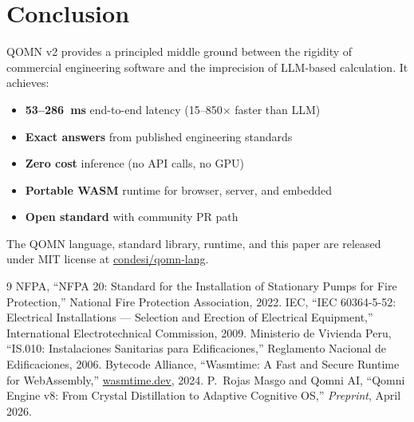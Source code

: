 \documentclass[12pt,a4paper]{article}
\begin{document}
\section{Conclusion}

QOMN v2 provides a principled middle ground between the rigidity of
commercial engineering software and the imprecision of LLM-based calculation.
It achieves:
\begin{itemize}
  \item \textbf{53--286~ms} end-to-end latency (15--850$\times$ faster than LLM)
  \item \textbf{Exact answers} from published engineering standards
  \item \textbf{Zero cost} inference (no API calls, no GPU)
  \item \textbf{Portable WASM} runtime for browser, server, and embedded
  \item \textbf{Open standard} with community PR path
\end{itemize}

The QOMN language, standard library, runtime, and this paper are released
under MIT license at \href{https://github.com/condesi/qomn-lang}{condesi/qomn-lang}.


\begin{thebibliography}{9}
  NFPA, ``NFPA 20: Standard for the Installation of Stationary Pumps
  for Fire Protection,'' National Fire Protection Association, 2022.
  IEC, ``IEC 60364-5-52: Electrical Installations — Selection and Erection
  of Electrical Equipment,'' International Electrotechnical Commission, 2009.
  Ministerio de Vivienda Peru, ``IS.010: Instalaciones Sanitarias para
  Edificaciones,'' Reglamento Nacional de Edificaciones, 2006.
  Bytecode Alliance, ``Wasmtime: A Fast and Secure Runtime for WebAssembly,''
  \href{https://wasmtime.dev}{wasmtime.dev}, 2024.
  P.~Rojas Masgo and Qomni AI, ``Qomni Engine v8: From Crystal Distillation
  to Adaptive Cognitive OS,'' \emph{Preprint}, April 2026.
\end{thebibliography}
\end{document}
